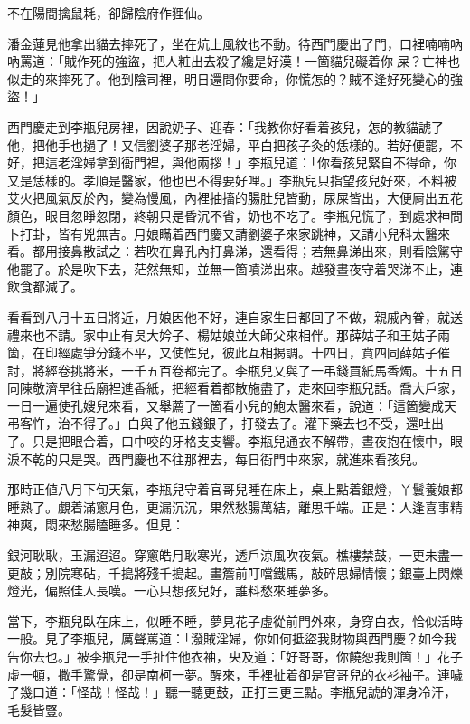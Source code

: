 \begin{myquote} 
不在陽間擒鼠耗，卻歸陰府作狸仙。
\end{myquote} 

潘金蓮見他拿出貓去摔死了，坐在炕上風紋也不動。待西門慶出了門，口裡喃喃吶吶罵道：「賊作死的強盜，把人粧出去殺了纔是好漢！一箇貓兒礙着你𠳹屎？亡神也似走的來摔死了。他到陰司裡，明日還問你要命，你慌怎的？賊不逢好死變心的強盜！」{}

西門慶走到李瓶兒房裡，因說奶子、迎春：「我教你好看着孩兒，怎的教貓諕了他，把他手也撾了！又信劉婆子那老淫婦，平白把孩子灸的恁樣的。若好便罷，不好，把這老淫婦拿到衙門裡，與他兩拶！」李瓶兒道：「你看孩兒緊自不得命，你又是恁樣的。孝順是醫家，他也巴不得要好哩。」李瓶兒只指望孩兒好來，不料被艾火把風氣反於內，變為慢風，內裡抽搐的腸肚兒皆動，尿屎皆出，大便屙出五花顏色，眼目忽睜忽閉，終朝只是昏沉不省，奶也不吃了。李瓶兒慌了，到處求神問卜打卦，皆有兇無吉。月娘瞞着西門慶又請劉婆子來家跳神，又請小兒科太醫來看。都用接鼻散試之：若吹在鼻孔內打鼻涕，還看得；若無鼻涕出來，則看陰騭守他罷了。於是吹下去，茫然無知，並無一箇噴涕出來。越發晝夜守着哭涕不止，連飲食都減了。

看看到八月十五日將近，月娘因他不好，連自家生日都回了不做，親戚內眷，就送禮來也不請。家中止有吳大妗子、楊姑娘並大師父來相伴。那薛姑子和王姑子兩箇，在印經處爭分錢不平，又使性兒，彼此互相揭調。十四日，賁四同薛姑子催討，將經卷挑將米，一千五百卷都完了。李瓶兒又與了一弔錢買紙馬香燭。十五日同陳敬濟早往岳廟裡進香紙，把經看着都散施盡了，走來回李瓶兒話。喬大戶家，一日一遍使孔嫂兒來看，又舉薦了一箇看小兒的鮑太醫來看，說道：「這箇變成天弔客忤，治不得了。」白與了他五錢銀子，打發去了。灌下藥去也不受，還吐出了。只是把眼合着，口中咬的牙格支支響。李瓶兒通衣不解帶，晝夜抱在懷中，眼淚不乾的只是哭。西門慶也不往那裡去，每日衙門中來家，就進來看孩兒。

那時正値八月下旬天氣，李瓶兒守着官哥兒睡在床上，桌上點着銀燈，丫鬟養娘都睡熟了。覷着滿窻月色，更漏沉沉，果然愁腸萬結，離思千端。正是：人逢喜事精神爽，悶來愁腸瞌睡多。但見：

\begin{myquote} 
銀河耿耿，玉漏迢迢。穿窻皓月耿寒光，透戶涼風吹夜氣。樵樓禁鼓，一更未盡一更敲；別院寒砧，千搗將殘千搗起。畫簷前叮噹鐵馬，敲碎思婦情懷；銀臺上閃爍燈光，偏照佳人長嘆。一心只想孩兒好，誰料愁來睡夢多。
\end{myquote} 

當下，李瓶兒臥在床上，似睡不睡，夢見花子虛從前門外來，身穿白衣，恰似活時一般。見了李瓶兒，厲聲罵道：「潑賊淫婦，你如何抵盜我財物與西門慶？如今我告你去也。」被李瓶兒一手扯住他衣袖，央及道：「好哥哥，你饒恕我則箇！」花子虛一頓，撒手驚覺，卻是南柯一夢。{}醒來，手裡扯着卻是官哥兒的衣衫袖子。連噦了幾口道：「怪哉！怪哉！」聽一聽更鼓，正打三更三點。李瓶兒諕的渾身冷汗，毛髮皆豎。

